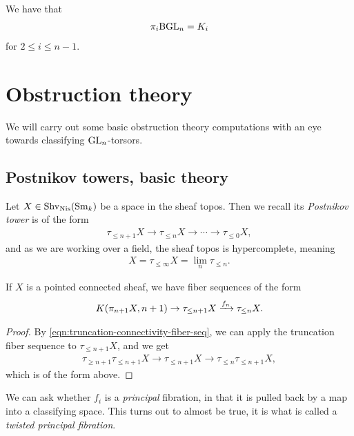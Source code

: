 \documentclass[11pt,openany]{book}
\begin{document}
\begin{corollary} \cite[6.15]{AE}
We have that
\begin{align*}
    \pi_i \mathrm{BGL}_n = K_i
\end{align*}
for $2\le i\le n-1$.
\end{corollary}


\section{Obstruction theory}

We will carry out some basic obstruction theory computations with an eye towards classifying $\mathrm{GL}_n$-torsors. 

\subsection{Postnikov towers, basic theory}

Let $X \in \mathrm{Shv}_{\mathrm{Nis}}(\mathrm{Sm}_k)$ be a space in the sheaf topos. Then we recall its \textit{Postnikov tower} is of the form
\begin{align*}
    \tau_{\le n+1} X\to \tau_{\le n} X\to \cdots \to \tau_{\le 0}X,
\end{align*}
and as we are working over a field, the sheaf topos is hypercomplete, meaning
\begin{align*}
    X = \tau_{\le \infty} X = \lim_n \tau_{\le n}.
\end{align*}
%
\begin{proposition} If $X$ is a pointed connected sheaf, we have fiber sequences of the form
\begin{align*}
    K(\pi_{n+1} X, n+1) \to \tau_{\le n+1} X \xrightarrow{f_n} \tau_{\le n} X.
\end{align*}
\end{proposition}
\begin{proof} By \autoref{eqn:truncation-connectivity-fiber-seq}, we can apply the truncation fiber sequence to $\tau_{\le n+1} X$, and we get
\begin{align*}
    \tau_{\ge n+1} \tau_{\le n+1}X \to \tau_{\le n+1} X \to \tau_{\le n} \tau_{\le n+1} X,
\end{align*}
which is of the form above.
\end{proof}

We can ask whether $f_i$ is a \textit{principal} fibration, in that it is pulled back by a map into a classifying space. This turns out to almost be true, it is what is called a \textit{twisted principal fibration}.
\end{document}
